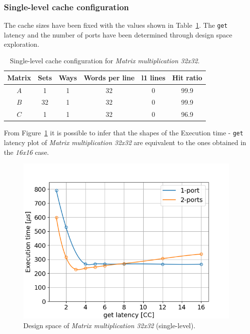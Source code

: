 \documentclass[11pt,a4paper,oneside]{memoir}
\begin{document}
\subsubsection{Single-level cache configuration}
The cache sizes have been fixed with the values shown in
Table~\ref{tab:matmul_32_no_l1_config}. The \texttt{get} latency and the number
of ports have been determined through design space exploration.

\begin{table}[H]
	\begin{center}
		\begin{tabular}{cccccc}
			\hline
			\rowcolor{gray!50}
			\textbf{Matrix} & \textbf{Sets} & \textbf{Ways} &
			\textbf{Words per line} & \textbf{\ac{l1} lines} &
			\textbf{Hit ratio} \\
			\hline
			$A$ & 1 & 1 & 32 & 0 & 99.9 \\
			\rowcolor{gray!25}
			$B$ & 32 & 1 & 32 & 0 & 99.9 \\
			$C$ & 1 & 1 & 32 & 0 & 96.9 \\
			\hline
		\end{tabular}
	\end{center}
	\caption{Single-level cache configuration for \emph{Matrix
	multiplication 32x32}.}
	\label{tab:matmul_32_no_l1_config}
\end{table}

From Figure~\ref{fig:matmul_32_no_l1_space} it is possible to infer that the
shapes of the Execution time - \texttt{get} latency plot of \emph{Matrix
multiplication 32x32} are equivalent to the ones obtained in the \emph{16x16}
case.

\begin{figure}[H]
	\centering
	\includegraphics[width=.8\textwidth]{matmul_32_multiport_no_L1_latency}
	\caption{Design space of \emph{Matrix multiplication 32x32}
	(single-level).}
	\label{fig:matmul_32_no_l1_space}
\end{figure}
\end{document}
